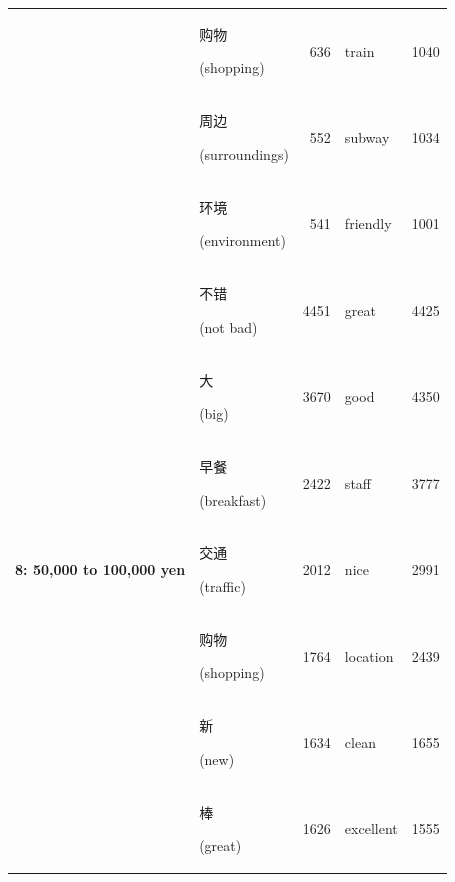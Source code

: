 \documentclass[smallextended,natbib]{svjour3}       %
\begin{document}
\begin{table}[ht]
{\begin{tabular}{|c|lr|lr|}
                                                             & \begin{CJK}{UTF8}{gbsn}购物\end{CJK} (shopping)        & 636   & train       & 1040  \\  
                                                             & \begin{CJK}{UTF8}{gbsn}周边\end{CJK} (surroundings)    & 552   & subway      & 1034  \\  
                                                             & \begin{CJK}{UTF8}{gbsn}环境\end{CJK} (environment)    & 541   & friendly    & 1001  \\ \hline
        \multirow{10}{*}{\textbf{8: 50,000 to 100,000 yen}}  & \begin{CJK}{UTF8}{gbsn}不错\end{CJK} (not bad)         & 4451  & great       & 4425  \\  
                                                             & \begin{CJK}{UTF8}{gbsn}大\end{CJK} (big)              & 3670  & good        & 4350  \\  
                                                             & \begin{CJK}{UTF8}{gbsn}早餐\end{CJK} (breakfast)       & 2422  & staff       & 3777  \\  
                                                             & \begin{CJK}{UTF8}{gbsn}交通\end{CJK} (traffic)         & 2012  & nice        & 2991  \\  
                                                             & \begin{CJK}{UTF8}{gbsn}购物\end{CJK} (shopping)        & 1764  & location    & 2439  \\  
                                                             & \begin{CJK}{UTF8}{gbsn}新\end{CJK} (new)              & 1634  & clean       & 1655  \\  
                                                             & \begin{CJK}{UTF8}{gbsn}棒\end{CJK} (great)            & 1626  & excellent   & 1555  \\  

\end{tabular}}
\end{table}
\end{document}
